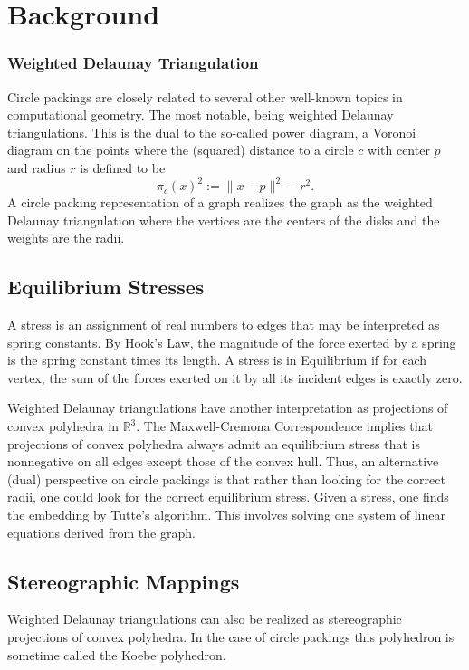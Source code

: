\documentclass[a4paper,UKenglish]{lipics}
\newcommand{\R}{\mathbb{R}}
\begin{document}

\section{Background} %
\label{sec:background}

  \subsubsection{Weighted Delaunay Triangulation}
  Circle packings are closely related to several other well-known topics in computational geometry.
  The most notable, being weighted Delaunay triangulations.  
  This is the dual to the so-called power diagram, a Voronoi diagram on the points where the (squared) distance to a circle $c$ with center $p$ and radius $r$ is defined to be
  \[
    \pi_c(x)^2 := \|x-p\|^2 - r^2.
  \]
  A circle packing representation of a graph realizes the graph as the weighted Delaunay triangulation where the vertices are the centers of the disks and the weights are the radii.
  
  \subsection{Equilibrium Stresses} %
  \label{sub:equilibrium_stresses}
    A stress is an assignment of real numbers to edges that may be interpreted as spring constants.
    By Hook's Law, the magnitude of the force exerted by a spring is the spring constant times its length.
    A stress is in Equilibrium if for each vertex, the sum of the forces exerted on it by all its incident edges is exactly zero.
    
    Weighted Delaunay triangulations have another interpretation as projections of convex polyhedra in $\R^3$.
    The Maxwell-Cremona Correspondence implies that projections of convex polyhedra always admit an equilibrium stress that is nonnegative on all edges except those of the convex hull.
    Thus, an alternative (dual) perspective on circle packings is that rather than looking for the correct radii, one could look for the correct equilibrium stress.
    Given a stress, one finds the embedding by Tutte's algorithm.
    This involves solving one system of linear equations derived from the graph.
  
  \subsection{Stereographic Mappings} %
  \label{sec:stereographic_mappings}
    Weighted Delaunay triangulations can also be realized as stereographic projections of convex polyhedra.
    In the case of circle packings this polyhedron is sometime called the Koebe polyhedron.
\end{document}
